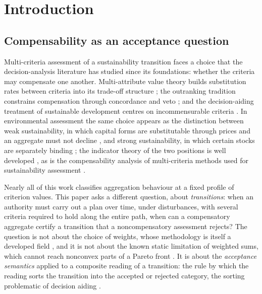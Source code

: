 \documentclass[preprint,11pt,authoryear]{elsarticle}
\theoremstyle{definition}
\theoremstyle{remark}
\begin{document}
\section{Introduction}\label{sec:intro}

\subsection{Compensability as an acceptance question}

Multi-criteria assessment of a sustainability transition faces a choice that the decision-analysis literature has studied since its foundations: whether the criteria may compensate one another. Multi-attribute value theory builds substitution rates between criteria into its trade-off structure \citep{KeeneyRaiffa1976}; the outranking tradition constrains compensation through concordance and veto \citep{Roy1996,Vincke1992}; and the decision-aiding treatment of sustainable development centres on incommensurable criteria \citep{Munda2005,MartinezAlier1998}. In environmental assessment the same choice appears as the distinction between weak sustainability, in which capital forms are substitutable through prices and an aggregate must not decline \citep{WorldBank2011,Neumayer2013,Boos2015}, and strong sustainability, in which certain stocks are separately binding \citep{Daly1990,Ekins2003}; the indicator theory of the two positions is well developed \citep{Hanley1999,Martinet2011,CairnsMartinet2014,DoyenGajardo2020,Usubiaga2025}, as is the compensability analysis of multi-criteria methods used for sustainability assessment \citep{Cinelli2014,Schar2025}.

Nearly all of this work classifies aggregation behaviour at a fixed profile of criterion values. This paper asks a different question, about \emph{transitions}: when an authority must carry out a plan over time, under disturbances, with several criteria required to hold along the entire path, when can a compensatory aggregate certify a transition that a noncompensatory assessment rejects? The question is not about the choice of weights, whose methodology is itself a developed field \citep{Nardo2008,Becker2017}, and it is not about the known static limitation of weighted sums, which cannot reach nonconvex parts of a Pareto front \citep{DasDennis1997}. It is about the \emph{acceptance semantics} applied to a composite reading of a transition: the rule by which the reading sorts the transition into the accepted or rejected category, the sorting problematic of decision aiding \citep{Roy1996}.
\end{document}
